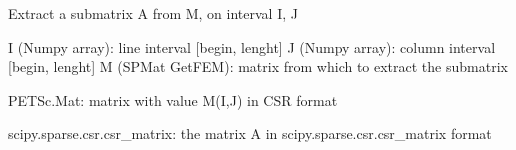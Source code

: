 \documentclass[letterpaper,10pt,english]{sphinxmanual}
\begin{document}

\begin{fulllineitems}
\label{\detokenize{scrimp.utils:scrimp.utils.linalg.extract_gmm_to_scipy}}
\pysigstartsignatures
\pysiglinewithargsret
{}
{\sphinxparamcomma {}\sphinxparamcomma {}}
{}
\pysigstopsignatures
\sphinxAtStartPar
Extract a sub\sphinxhyphen{}matrix A from M, on interval I, J
\begin{description}
\sphinxAtStartPar
I (Numpy array): line interval {[}begin, lenght{]}
J (Numpy array): column interval {[}begin, lenght{]}
M (SPMat GetFEM): matrix from which to extract the submatrix

\sphinxAtStartPar
PETSc.Mat: matrix with value M(I,J) in CSR format

\sphinxAtStartPar
scipy.sparse.csr.csr\_matrix: the matrix A in scipy.sparse.csr.csr\_matrix format

\end{description}

\end{fulllineitems}

\end{document}
